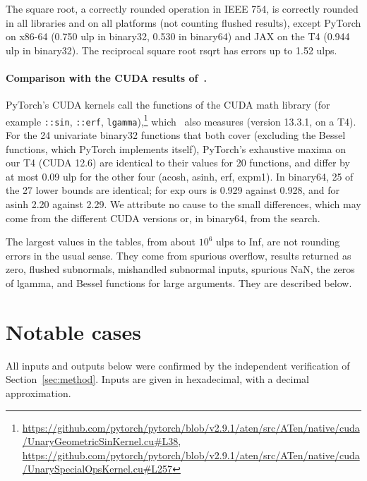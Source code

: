 \documentclass[11pt,a4paper]{article}
\begin{document}
The square root, a correctly rounded operation in IEEE 754, is correctly rounded in all libraries and on all platforms (not counting flushed results), except PyTorch on x86-64 (0.750 ulp in binary32, 0.530 in binary64) and JAX on the T4 (0.944 ulp in binary32). The reciprocal square root rsqrt has errors up to 1.52 ulps.

\paragraph{Comparison with the CUDA results of~\cite{GIMOZ2026}.} PyTorch's CUDA kernels call the functions of the CUDA math library (for example \texttt{::sin}, \texttt{::erf}, \texttt{lgamma}),\footnote{\url{https://github.com/pytorch/pytorch/blob/v2.9.1/aten/src/ATen/native/cuda/UnaryGeometricSinKernel.cu\#L38}, \url{https://github.com/pytorch/pytorch/blob/v2.9.1/aten/src/ATen/native/cuda/UnarySpecialOpsKernel.cu\#L257}} which~\cite{GIMOZ2026} also measures (version 13.3.1, on a T4). For the 24 univariate binary32 functions that both cover (excluding the Bessel functions, which PyTorch implements itself), PyTorch's exhaustive maxima on our T4 (CUDA 12.6) are identical to their values for 20 functions, and differ by at most 0.09 ulp for the other four (acosh, asinh, erf, expm1). In binary64, 25 of the 27 lower bounds are identical; for exp ours is 0.929 against 0.928, and for asinh 2.20 against 2.29. We attribute no cause to the small differences, which may come from the different CUDA versions or, in binary64, from the search.

The largest values in the tables, from about $10^6$ ulps to Inf, are not rounding errors in the usual sense. They come from spurious overflow, results returned as zero, flushed subnormals, mishandled subnormal inputs, spurious NaN, the zeros of lgamma, and Bessel functions for large arguments. They are described below.

\section{Notable cases}\label{sec:findings}
All inputs and outputs below were confirmed by the independent verification of Section~\ref{sec:method}. Inputs are given in hexadecimal, with a decimal approximation.
\end{document}
